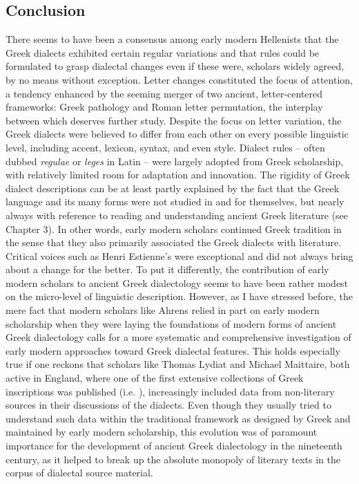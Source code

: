 \documentclass[output=paper]{langsci/langscibook}
\begin{document}
\subsection{Conclusion}
\hypertarget{Toc19704848}{}
There seems to have been a consensus among early modern Hellenists that the Greek dialects exhibited certain regular variations and that rules could be formulated to grasp dialectal changes even if these were, scholars widely agreed, by no means without exception. Letter changes constituted the focus of attention, a tendency enhanced by the seeming merger of two ancient, letter-centered frameworks: Greek pathology and Roman letter permutation, the interplay between which deserves further study. Despite the focus on letter variation, the Greek dialects were believed to differ from each other on every possible linguistic level, including accent, lexicon, syntax, and even style. Dialect rules – often dubbed \textit{regulae} or \textit{leges} in Latin – were largely adopted from Greek scholarship, with relatively limited room for adaptation and innovation. The rigidity of Greek dialect descriptions can be at least partly explained by the fact that the Greek language and its many forms were not studied in and for themselves, but nearly always with reference to reading and understanding ancient Greek literature (see Chapter 3). In other words, early modern scholars continued Greek tradition in the sense that they also primarily associated the Greek dialects with literature. Critical voices such as Henri Estienne’s were exceptional and did not always bring about a change for the better. To put it differently, the contribution of early modern scholars to ancient Greek dialectology seems to have been rather modest on the micro-level of linguistic description. However, as I have stressed before, the mere fact that modern scholars like Ahrens relied in part on early modern scholarship when they were laying the foundations of modern forms of ancient Greek dialectology calls for a more systematic and comprehensive investigation of early modern approaches toward Greek dialectal features. This holds especially true if one reckons that scholars like Thomas Lydiat and Michael Maittaire, both active in England, where one of the first extensive collections of Greek inscriptions was published (i.e. \citealt{Prideaux1676}), increasingly included data from non-literary sources in their discussions of the dialects. Even though they usually tried to understand such data within the traditional framework as designed by Greek and maintained by early modern scholarship, this evolution was of paramount importance for the development of ancient Greek dialectology in the nineteenth century, as it helped to break up the absolute monopoly of literary texts in the corpus of dialectal source material.
\end{document}
